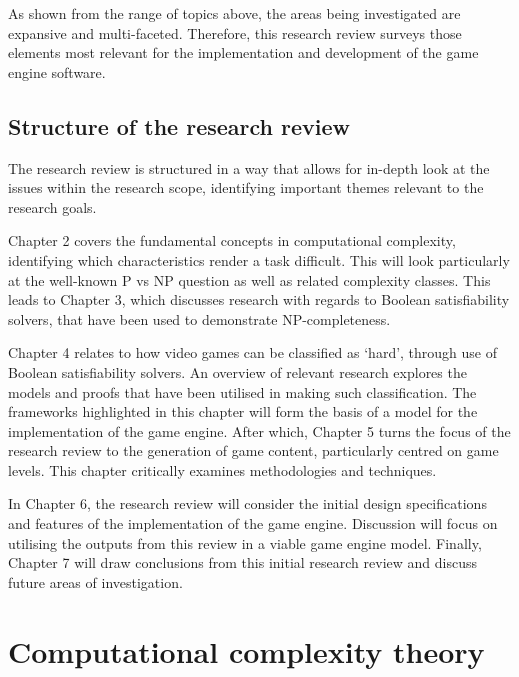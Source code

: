 \documentclass[11pt, a4paper, oneside]{report} %
\begin{document}
As shown from the range of topics above, the areas being investigated are expansive and multi-faceted. Therefore, this research review surveys those elements most relevant for the
implementation and development of the game engine software.

\section{Structure of the research review}

The research review is structured in a way that allows for in-depth look at the issues within the
research scope, identifying important themes relevant to the research goals.

Chapter 2 covers the fundamental concepts in computational complexity, identifying which
characteristics render a task difficult. This will look particularly at the well-known P vs NP
question as well as related complexity classes. This leads to Chapter 3, which discusses research with
regards to Boolean satisfiability solvers, that have been used to demonstrate NP-completeness.

Chapter 4 relates to how video games can be classified as `hard', through use of Boolean
satisfiability solvers. An overview of relevant research explores the models and proofs
that have been utilised in making such classification. The frameworks highlighted in this chapter will form the
basis of a model for the implementation of the game engine. After which, Chapter 5 turns the focus of the research review
to the generation of game content, particularly centred on game levels.  This chapter critically
examines methodologies and techniques.

In Chapter 6, the research review will consider the initial design specifications and features of
the implementation of the game engine. Discussion will focus on utilising the outputs from this
review in a viable game engine model. Finally, Chapter 7 will draw conclusions from this initial
research review and discuss future areas of investigation.


\chapter{Computational complexity theory}
\end{document}
